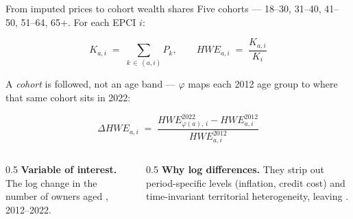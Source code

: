 \documentclass[aspectratio=169]{beamer}
\begin{document}
\begin{frame}{From imputed prices to cohort wealth shares}
    Five cohorts --- 18--30, 31--40, 41--50, 51--64, 65+. For each EPCI $i$:

    \begin{equation*}
        K_{a,i} \;=\; \sum_{k \,\in\, (a,i)} P_k ,
        \qquad
        HWE_{a,i} \;=\; \frac{K_{a,i}}{K_i}
    \end{equation*}

    A \emph{cohort} is followed, not an age band --- $\varphi$ maps each 2012 age
    group to where that same cohort sits in 2022:

    \begin{equation*}
        \Delta HWE_{a,i}
        \;=\;
        \frac{HWE^{2022}_{\varphi(a),\,i} - HWE^{2012}_{a,i}}{HWE^{2012}_{a,i}}
    \end{equation*}

    \begin{columns}[T]
        \begin{column}{0.5\textwidth}
            \textbf{Variable of interest.} The log change in the number of
            owners aged , 2012--2022.
        \end{column}
        \begin{column}{0.5\textwidth}
            \textbf{Why log differences.} They strip out period-specific levels
            (inflation, credit cost) and time-invariant territorial
            heterogeneity, leaving .
        \end{column}
    \end{columns}

    \vspace{0.2em}
\end{frame}
\end{document}
